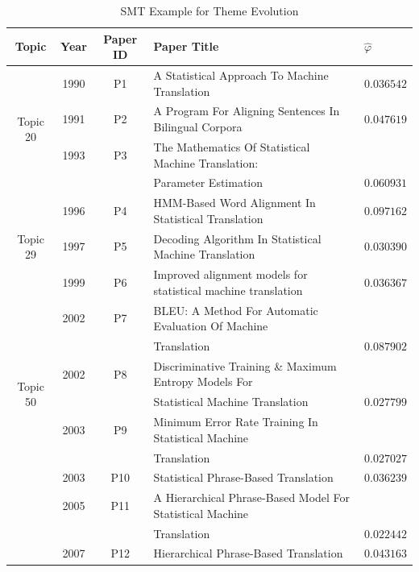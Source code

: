 \begin{table}[t!]
\caption{SMT Example for Theme Evolution}
\label{tab:smt_ex}
\begin{center}
\begin{tabular}{|c|c|c|l|l|}
\hline
Topic &Year & Paper ID & Paper Title & $\hat\varphi$ \\ \hline \hline
\multirow{4}{*}{Topic 20}
          & 1990 & P1 &
  A Statistical Approach To Machine Translation & $0.036542$ \\
					& 1991 & P2 &
  A Program For Aligning Sentences In Bilingual Corpora & $0.047619$ \\
					& 1993 & P3 &
  The Mathematics Of Statistical Machine Translation: &\\
  &&& \; Parameter Estimation & $0.060931$\\
  \hline
\multirow{3}{*}{Topic 29} 	& 1996 & P4 &
  HMM-Based Word Alignment In Statistical Translation & $0.097162$\\
					& 1997 & P5 &
  Decoding Algorithm In Statistical Machine Translation & $0.030390$\\
					& 1999 & P6 &
  Improved alignment models for statistical machine translation & $0.036367$\\
  \hline
\multirow{7}{*}{Topic 50}
          & 2002 & P7 &
  BLEU: A Method For Automatic Evaluation Of Machine &\\
  &&& \; Translation & $0.087902$ \\
          & 2002 	& P8 	&
  Discriminative Training \& Maximum Entropy Models For &\\
  &&& \; Statistical Machine Translation & $0.027799$\\
					& 2003 & P9 &
  Minimum Error Rate Training In Statistical Machine & \\
  &&& \; Translation & $0.027027$\\
  \hline
\multirow{4}{*}{Topic 93}
          & 2003 & P10&
  Statistical Phrase-Based Translation & $0.036239$\\
					& 2005 & P11&
  A Hierarchical Phrase-Based Model For Statistical Machine &\\
  &&& \; Translation & $0.022442$ \\
					& 2007 & P12&
  Hierarchical Phrase-Based Translation & $0.043163$\\
  \hline\hline
\end{tabular}
\end{center}
\end{table}

